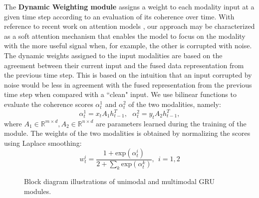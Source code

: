 \documentclass[10pt,twocolumn,letterpaper]{article}
\begin{document}
The \textbf{Dynamic Weighting module} assigns a weight to each modality input at a given time step according to an evaluation of its coherence over time. With reference to recent work on attention models \cite{BahdanauCB14}, our approach may be characterized as a soft attention mechanism that enables the model to focus on the modality with the more useful signal when, for example, the other is corrupted with noise. The dynamic weights assigned to the input modalities are based on the agreement between their current input and the fused data representation from the previous time step. This is based on the intuition that an input corrupted by noise would be less in agreement with the fused representation from the previous time step when compared with a ``clean" input. We use bilinear functions to evaluate the coherence scores $\alpha_t^1$ and $\alpha_t^2$ of the two modalities, namely:
$$\alpha_t^1 = x_t A_1 h_{t-1}^T,\ \ \  \alpha_t^2 = y_t A_2 h_{t-1}^T,$$
where $A_1 \in \mathbb{R}^{m\times d}, A_2 \in \mathbb{R}^{n\times d}$ are parameters learned during the training of the module. The weights of the two modalities is obtained by normalizing the scores using Laplace smoothing:
$$w_t^i = \frac{1 + \text{exp}(\alpha_t^i)}{2 + \sum_k \text{exp}(\alpha_t^k)}, \ \ i=1,2 $$


\begin{figure}
\begin{center}
	\begin{subfigure}[Unimodal GRU]{\texttt{[image: figure/GRU.pdf]}}
    \end{subfigure}
    \begin{subfigure}[Multimodal GRU]{\texttt{[image: figure/GRU2.pdf]}}
    \end{subfigure}
\end{center}
\caption{Block diagram illustrations of unimodal and multimodal GRU modules.}
\label{fig:GRU}
\end{figure}
\end{document}
